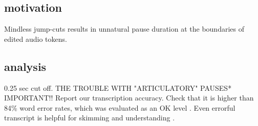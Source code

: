\subsection{motivation}
Mindless jump-cuts results in unnatural pause duration at the boundaries of edited audio tokens.

\subsection{analysis}
0.25 sec cut off. THE TROUBLE WITH "ARTICULATORY" PAUSES*
IMPORTANT!! Report our transcription accuracy. Check that it is higher than 84\% word error rates, which was evaluated as an OK level \cite{stark2000asr}.
Even errorful transcript is helpful for skimming and understanding \cite{Whittaker:1999}.